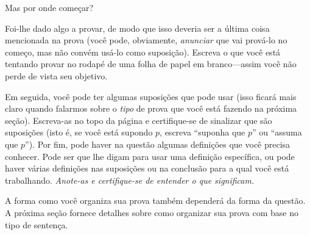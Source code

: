 \documentclass[../../../include/open-logic-section]{subfiles}
\begin{document}


Mas por onde começar?

Foi-lhe dado algo a provar, de modo que isso deveria ser a última
coisa mencionada na prova (você pode, obviamente, \emph{anunciar} que
vai prová-lo no começo, mas não convém usá-lo como suposição). Escreva
o que você está tentando provar no rodapé de uma folha de papel em
branco---assim você não perde de vista seu objetivo.

Em seguida, você pode ter algumas suposições que pode usar (isso
ficará mais claro quando falarmos sobre o \emph{tipo} de prova que você
está fazendo na próxima seção). Escreva-as no topo da página e
certifique-se de sinalizar que são suposições (isto é, se você está
supondo $p$, escreva ``suponha que $p$'' ou ``assuma que $p$''). Por
fim, pode haver na questão algumas definições que você precisa
conhecer. Pode ser que lhe digam para usar uma definição específica, ou
pode haver várias definições nas suposições ou na conclusão para a qual
você está trabalhando. \emph{Anote-as e certifique-se de entender o que
significam.}

A forma como você organiza sua prova também dependerá da forma da
questão. A próxima seção fornece detalhes sobre como organizar sua
prova com base no tipo de sentença.
\end{document}
